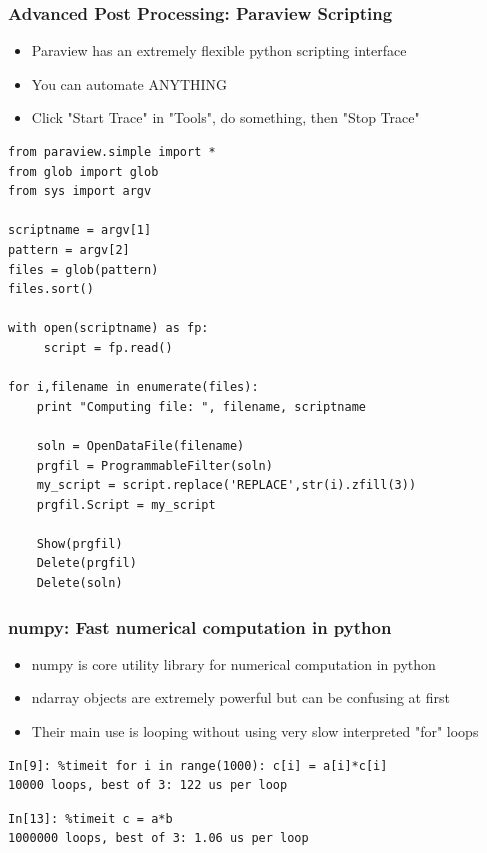 \documentclass[landscape,10pt]{beamer}
\begin{document}
\begin{frame}[fragile]
\frametitle{Advanced Post Processing: Paraview Scripting}
\begin{itemize}
\item Paraview has an extremely flexible python scripting interface
\item You can automate ANYTHING
\item Click "Start Trace" in "Tools", do something, then "Stop Trace"
\end{itemize}

\begin{scriptsize}
\begin{lstlisting}
from paraview.simple import *
from glob import glob
from sys import argv

scriptname = argv[1]
pattern = argv[2]
files = glob(pattern)
files.sort()

with open(scriptname) as fp:
     script = fp.read()

for i,filename in enumerate(files):
    print "Computing file: ", filename, scriptname

    soln = OpenDataFile(filename)
    prgfil = ProgrammableFilter(soln)
    my_script = script.replace('REPLACE',str(i).zfill(3))
    prgfil.Script = my_script

    Show(prgfil)
    Delete(prgfil)
    Delete(soln)
\end{lstlisting}
\end{scriptsize}
\end{frame}

\begin{frame}[fragile]
\frametitle{numpy: Fast numerical computation in python}
\begin{itemize}
\item numpy is core utility library for numerical computation in python
\item ndarray objects are extremely powerful but can be confusing at first
\item Their main use is looping without using very slow interpreted "for" loops
\end{itemize}

\vspace{7mm}
\begin{small}
\begin{lstlisting}
In[9]: %timeit for i in range(1000): c[i] = a[i]*c[i]
10000 loops, best of 3: 122 us per loop
\end{lstlisting}
\end{small}

\begin{small}
\begin{lstlisting}
In[13]: %timeit c = a*b
1000000 loops, best of 3: 1.06 us per loop
\end{lstlisting}
\end{small}

\end{frame}
\end{document}
